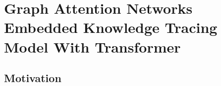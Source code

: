 \chapter{Graph Attention Networks Embedded Knowledge Tracing Model With Transformer}

\ifpdf
	\graphicspath{{Chapter3/Figs/Raster/}{Chapter3/Figs/PDF/}{Chapter3/Figs/}}
\else
	\graphicspath{{Chapter3/Figs/Vector/}{Chapter3/Figs/}}
\fi

\section{Motivation}

